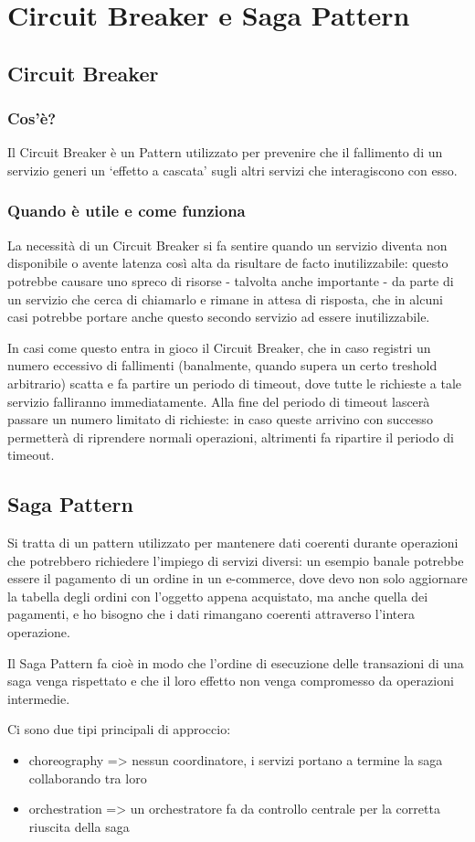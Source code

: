 \chapter{Circuit Breaker e Saga Pattern}
\section{Circuit Breaker}
\subsection{Cos'è?}
Il Circuit Breaker è un Pattern utilizzato per prevenire che il fallimento di un servizio generi un `effetto a cascata' sugli altri servizi che interagiscono con esso.

\subsection{Quando è utile e come funziona}
La necessità di un Circuit Breaker si fa sentire quando un servizio diventa non disponibile o avente latenza così alta da risultare de facto inutilizzabile: questo potrebbe causare uno spreco di risorse - talvolta anche importante - da parte di un servizio che cerca di chiamarlo e rimane in attesa di risposta, che in alcuni casi potrebbe portare anche questo secondo servizio ad essere inutilizzabile.

In casi come questo entra in gioco il Circuit Breaker, che in caso registri un numero eccessivo di fallimenti (banalmente, quando supera un certo treshold arbitrario) scatta e fa partire un periodo di timeout, dove tutte le richieste a tale servizio falliranno immediatamente. Alla fine del periodo di timeout lascerà passare un numero limitato di richieste: in caso queste arrivino con successo permetterà di riprendere normali operazioni, altrimenti fa ripartire il periodo di timeout.

\section{Saga Pattern}
Si tratta di un pattern utilizzato per mantenere dati coerenti durante operazioni che potrebbero richiedere l'impiego di servizi diversi: un esempio banale potrebbe essere il pagamento di un ordine in un e-commerce, dove devo non solo aggiornare la tabella degli ordini con l'oggetto appena acquistato, ma anche quella dei pagamenti, e ho bisogno che i dati rimangano coerenti attraverso l'intera operazione.

Il Saga Pattern fa cioè in modo che l'ordine di esecuzione delle transazioni di una saga venga rispettato e che il loro effetto non venga compromesso da operazioni intermedie.

Ci sono due tipi principali di approccio: 
\begin{itemize}
    \item choreography => nessun coordinatore, i servizi portano a termine la saga collaborando tra loro
    \item orchestration => un orchestratore fa da controllo centrale per la corretta riuscita della saga
\end{itemize}